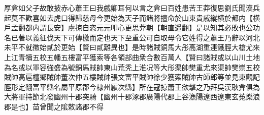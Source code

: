 厚弇如父子故敢披赤心蕭王曰我戲卿耳何以言之弇曰百姓患苦王莽復思劉氏聞漢兵起莫不歡喜如去虎口得歸慈母今更始為天子而諸將擅命於山東貴戚縱横於都内【横戶孟翻都内謂長安】虜掠自恣元元叩心更思莽朝【朝直遥翻】是以知其必敗也公功名已著以義征伐天下可傳檄而定也天下至重公可自取毋令它姓得之蕭王乃辭以河北未平不就徵始貳於更始【賢曰貳離異也】是時諸賊銅馬大彤高湖重連鐵脛大槍尤來上江青犢五校五幡五樓富平獲索等各領部曲衆合數百萬人【賢曰諸賊或以山川土地為名或以軍容強盛為號銅馬賊帥東山荒秃上淮况等大彤渠帥樊重尤來渠帥樊崇五校賊帥高扈檀鄉賊帥董次仲五樓賊帥張文富平賊帥徐少獲索賊帥古師郎等並見東觀記脛形定翻富平縣名屬平原郡今棣州厭次縣】所在寇掠蕭王欲擊之乃拜吳漢耿弇俱為大將軍持節北發幽州十郡突騎【幽州十郡涿郡廣陽代郡上谷漁陽遼西遼東玄菟樂浪郡是也】苗曾聞之隂敕諸郡不得